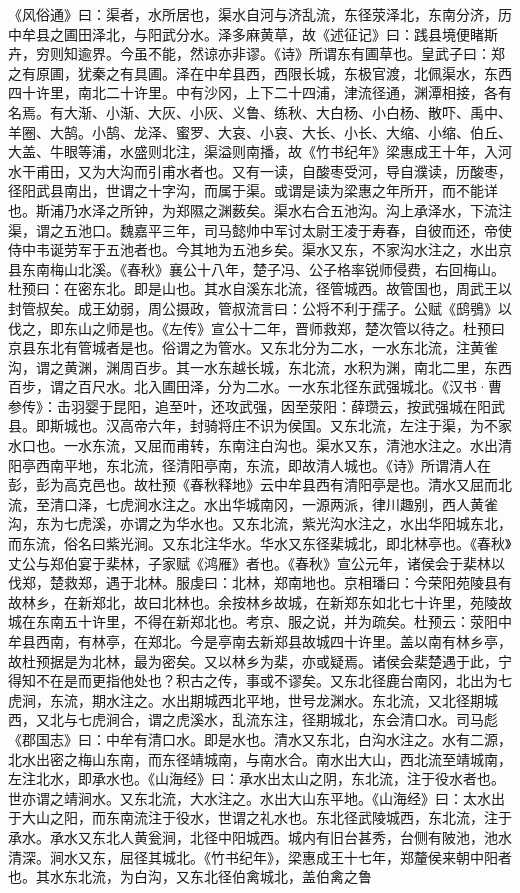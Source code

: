 \documentclass[12pt,UTF8]{ctexbook}
\begin{document}
《风俗通》曰：渠者，水所居也，渠水自河与济乱流，东径荥泽北，东南分济，历中牟县之圃田泽北，与阳武分水。泽多麻黄草，故《述征记》曰：践县境便睹斯卉，穷则知逾界。今虽不能，然谅亦非谬。《诗》所谓东有圃草也。皇武子曰：郑之有原圃，犹秦之有具圃。泽在中牟县西，西限长城，东极官渡，北佩渠水，东西四十许里，南北二十许里。中有沙冈，上下二十四浦，津流径通，渊潭相接，各有名焉。有大渐、小渐、大灰、小灰、义鲁、练秋、大白杨、小白杨、散吓、禹中、羊圈、大鹄。小鹄、龙泽、蜜罗、大哀、小哀、大长、小长、大缩、小缩、伯丘、大盖、牛眼等浦，水盛则北注，渠溢则南播，故《竹书纪年》梁惠成王十年，入河水干甫田，又为大沟而引甫水者也。又有一读，自酸枣受河，导自濮读，历酸枣，径阳武县南出，世谓之十字沟，而属于渠。或谓是读为梁惠之年所开，而不能详也。斯浦乃水泽之所钟，为郑隰之渊薮矣。渠水右合五池沟。沟上承泽水，下流注渠，谓之五池口。魏嘉平三年，司马懿帅中军讨太尉王凌于寿春，自彼而还，帝使侍中韦诞劳军于五池者也。今其地为五池乡矣。渠水又东，不家沟水注之，水出京县东南梅山北溪。《春秋》襄公十八年，楚子冯、公子格率锐师侵费，右回梅山。杜预曰：在密东北。即是山也。其水自溪东北流，径管城西。故管国也，周武王以封管叔矣。成王幼弱，周公摄政，管叔流言曰：公将不利于孺子。公赋《鸱鴞》以伐之，即东山之师是也。《左传》宣公十二年，晋师救郑，楚次管以待之。杜预曰京县东北有管城者是也。俗谓之为管水。又东北分为二水，一水东北流，注黄雀沟，谓之黄渊，渊周百步。其一水东越长城，东北流，水积为渊，南北二里，东西百步，谓之百尺水。北入圃田泽，分为二水。一水东北径东武强城北。《汉书·曹参传》：击羽婴于昆阳，追至叶，还攻武强，因至荥阳：薛瓒云，按武强城在阳武县。即斯城也。汉高帝六年，封骑将庄不识为侯国。又东北流，左注于渠，为不家水口也。一水东流，又屈而甫转，东南注白沟也。渠水又东，清池水注之。水出清阳亭西南平地，东北流，径清阳亭南，东流，即故清人城也。《诗》所谓清人在彭，彭为高克邑也。故杜预《春秋释地》云中牟县西有清阳亭是也。清水又屈而北流，至清口泽，七虎涧水注之。水出华城南冈，一源两派，律川趣别，西人黄雀沟，东为七虎溪，亦谓之为华水也。又东北流，紫光沟水注之，水出华阳城东北，而东流，俗名曰紫光涧。又东北注华水。华水又东径棐城北，即北林亭也。《春秋》丈公与郑伯宴于棐林，子家赋《鸿雁》者也。《春秋》宣公元年，诸侯会于棐林以伐郑，楚救郑，遇于北林。服虔曰：北林，郑南地也。京相璠曰：今荣阳苑陵县有故林乡，在新郑北，故曰北林也。余按林乡故城，在新郑东如北七十许里，苑陵故城在东南五十许里，不得在新郑北也。考京、服之说，并为疏矣。杜预云：荥阳中牟县西南，有林亭，在郑北。今是亭南去新郑县故城四十许里。盖以南有林乡亭，故杜预据是为北林，最为密矣。又以林乡为棐，亦或疑焉。诸侯会棐楚遇于此，宁得知不在是而更指他处也？积古之传，事或不谬矣。又东北径鹿台南冈，北出为七虎涧，东流，期水注之。水出期城西北平地，世号龙渊水。东北流，又北径期城西，又北与七虎涧合，谓之虎溪水，乱流东注，径期城北，东会清口水。司马彪《郡国志》曰：中牟有清口水。即是水也。清水又东北，白沟水注之。水有二源，北水出密之梅山东南，而东径靖城南，与南水合。南水出大山，西北流至靖城南，左注北水，即承水也。《山海经》曰：承水出太山之阴，东北流，注于役水者也。世亦谓之靖涧水。又东北流，大水注之。水出大山东平地。《山海经》曰：太水出于大山之阳，而东南流注于役水，世谓之礼水也。东北径武陵城西，东北流，注于承水。承水又东北人黄瓮涧，北径中阳城西。城内有旧台甚秀，台侧有陂池，池水清深。涧水又东，屈径其城北。《竹书纪年》，梁惠成王十七年，郑釐侯来朝中阳者也。其水东北流，为白沟，又东北径伯禽城北，盖伯禽之鲁
\end{document}
